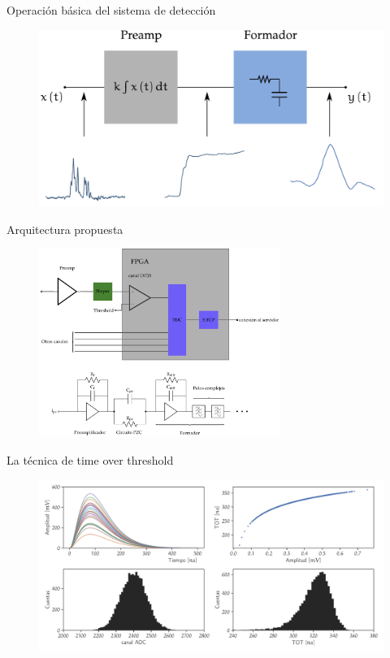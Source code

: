 \documentclass[spanish,aspectratio=169]{beamer}
\begin{document}
\begin{frame}{Operación básica del sistema de detección}

\begin{figure}
	\centering
	\includegraphics[width=\textwidth]{preamp-4.pdf}
\end{figure}

\end{frame}

\begin{frame}{Arquitectura propuesta}

\begin{figure}
	\centering
	\includegraphics[width=0.7\textwidth]{nfeb-prot.pdf}
\end{figure}

\end{frame}

\begin{frame}{La técnica de time over threshold}

\begin{figure}
        \centering
        \includegraphics[width=\textwidth]{TOT-model.pdf}
\end{figure}

\end{frame}
\end{document}
